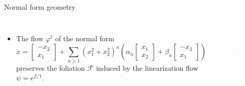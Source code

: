 \documentclass[10pt,T]{beamer}
\begin{document}
\begin{frame}{Normal form geometry}
\begin{columns}[T,onlytextwidth]
\column{\textwidth}
\begin{itemize}
\item<1-> The flow $\varphi^t$ of the normal form
  $$\dot{x}=\begin{bmatrix}-x_2\\x_1\end{bmatrix}+\sum_{n\geq1}(x_1^2+x_2^2)^n\left(
    \alpha_n\begin{bmatrix}x_1\\x_2\end{bmatrix} +
    \beta_n\begin{bmatrix}-x_2\\x_1\end{bmatrix} \right)$$ preserves the
  foliation $\mathcal{F}$ induced by the linearization flow $\psi=e^{f_1't}$.
\end{itemize}
\begin{figure}
    \includegraphics[keepaspectratio,width=.4\textwidth]{./fig/equivariance.pdf}\hspace{3mm}
  \includegraphics[keepaspectratio,width=.4\textwidth]{./fig/foliation.pdf}
\end{figure}
\end{columns}
\end{frame}
\end{document}

